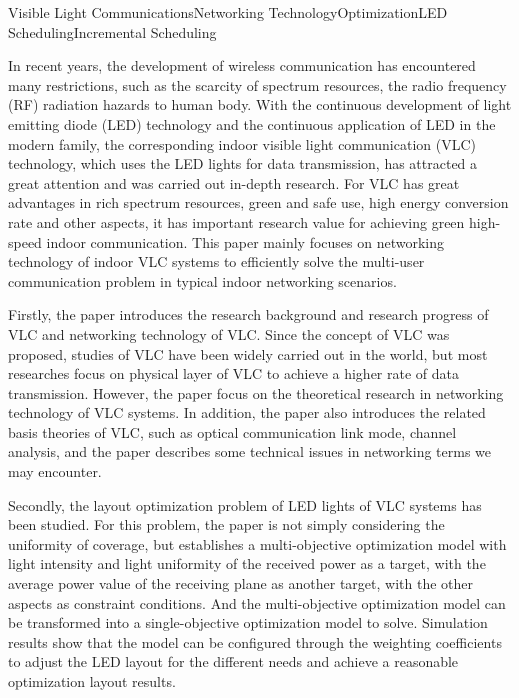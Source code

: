 
\begin{englishabstract}{Visible Light Communications\quad{}Networking Technology\quad{}Optimization\quad{}LED Scheduling\quad{}Incremental Scheduling}

In recent years, the development of wireless communication has encountered many restrictions,
such as the scarcity of spectrum resources, the radio frequency (RF) radiation hazards to human body.
With the continuous development of light emitting diode (LED) technology and the continuous application of LED in the modern family,
the corresponding indoor visible light communication (VLC) technology, which uses the LED lights for data transmission,
has attracted a great attention and was carried out in-depth research.
For VLC has great advantages in rich spectrum resources, green and safe use, high energy conversion rate and other aspects,
it has important research value for achieving green high-speed indoor communication.
This paper mainly focuses on networking technology of indoor VLC systems to efficiently solve the multi-user communication problem in typical indoor networking scenarios.

Firstly, the paper introduces the research background and research progress of VLC and networking technology of VLC.
Since the concept of VLC was proposed, studies of VLC have been widely carried out in the world, but most researches focus on physical layer of VLC to achieve a higher rate of data transmission.
However, the paper focus on the theoretical research in networking technology of VLC systems. In addition, the paper also introduces the related basis theories of VLC,
 such as optical communication link mode, channel analysis, and the paper describes some technical issues in networking terms we may encounter.

Secondly, the layout optimization problem of LED lights of VLC systems has been studied.
For this problem, the paper is not simply considering the uniformity of coverage,
but establishes a multi-objective optimization model with light intensity and light uniformity of the received power as a target, with the average power value of the receiving plane as another target,
with the other aspects as constraint conditions. And the multi-objective optimization model can be transformed into a single-objective optimization model to solve.
Simulation results show that the model can be configured through the weighting coefficients to adjust the LED layout for the different needs and achieve a reasonable optimization layout results.


\end{englishabstract}
